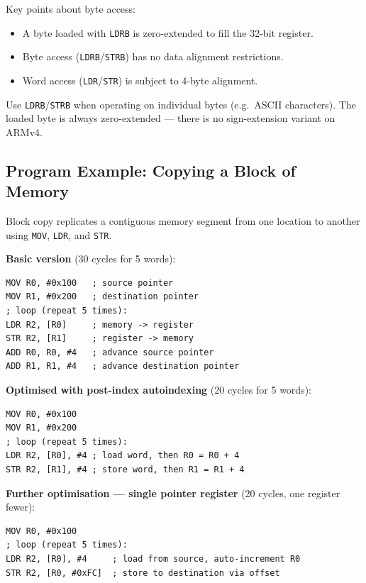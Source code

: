 \documentclass[11pt, a4paper, notitlepage]{report}
\theoremstyle{definition}
\theoremstyle{remark}
\theoremstyle{definition}
\begin{document}
Key points about byte access:

\begin{itemize}
  \item A byte loaded with \texttt{LDRB} is zero-extended to fill the 32-bit register.
  \item Byte access (\texttt{LDRB}/\texttt{STRB}) has no data alignment restrictions.
  \item Word access (\texttt{LDR}/\texttt{STR}) is subject to 4-byte alignment.
\end{itemize}

\begin{examtip}[title={Byte vs.\ Word Transfer}]
Use \texttt{LDRB}/\texttt{STRB} when operating on individual bytes (e.g.\ ASCII characters). The loaded byte is always zero-extended --- there is no sign-extension variant on ARMv4.
\end{examtip}

\subsection{Program Example: Copying a Block of Memory}

Block copy replicates a contiguous memory segment from one location to another using \texttt{MOV}, \texttt{LDR}, and \texttt{STR}.

\textbf{Basic version} (30 cycles for 5 words):

\begin{lstlisting}
MOV R0, #0x100   ; source pointer
MOV R1, #0x200   ; destination pointer
; loop (repeat 5 times):
LDR R2, [R0]     ; memory -> register
STR R2, [R1]     ; register -> memory
ADD R0, R0, #4   ; advance source pointer
ADD R1, R1, #4   ; advance destination pointer
\end{lstlisting}

\textbf{Optimised with post-index autoindexing} (20 cycles for 5 words):

\begin{lstlisting}
MOV R0, #0x100
MOV R1, #0x200
; loop (repeat 5 times):
LDR R2, [R0], #4 ; load word, then R0 = R0 + 4
STR R2, [R1], #4 ; store word, then R1 = R1 + 4
\end{lstlisting}

\textbf{Further optimisation --- single pointer register} (20 cycles, one register fewer):

\begin{lstlisting}
MOV R0, #0x100
; loop (repeat 5 times):
LDR R2, [R0], #4     ; load from source, auto-increment R0
STR R2, [R0, #0xFC]  ; store to destination via offset
\end{lstlisting}
\end{document}
